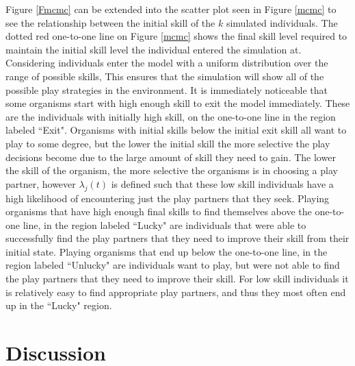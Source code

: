 \documentclass[12pt, letterpaper, fleqn]{article}
\begin{document}
      Figure \ref{Fmcmc} can be extended into the scatter plot seen in Figure \ref{mcmc} to see the relationship between the initial skill of the $k$ simulated individuals. 
      The dotted red one-to-one line on Figure \ref{mcmc} shows the final skill level required to maintain the initial skill level the individual entered the simulation at.
      Considering individuals enter the model with a uniform distribution over the range of possible skills, This ensures that the simulation will show all of the possible play strategies in the environment.    
      It is immediately noticeable that some organisms start with high enough skill to exit the model immediately.
      These are the individuals with initially high skill, on the one-to-one line in the region labeled ``Exit".
      Organisms with initial skills below the initial exit skill all want to play to some degree, but the lower the initial skill the more selective the play decisions become due to the large amount of skill they need to gain.
      The lower the skill of the organism, the more selective the organisms is in choosing a play partner, however $\lambda_j(t)$ is defined such that these low skill individuals have a high likelihood of encountering just the play partners that they seek.
      Playing organisms that have high enough final skills to find themselves above the one-to-one line, in the region labeled ``Lucky" are individuals that were able to successfully find the play partners that they need to improve their skill from their initial state.
      Playing organisms that end up below the one-to-one line, in the region labeled ``Unlucky" are individuals want to play, but were not able to find the play partners that they need to improve their skill. %
      For low skill individuals it is relatively easy to find appropriate play partners, and thus they most often end up in the ``Lucky" region.
      

      
    \section*{Discussion}
\end{document}
